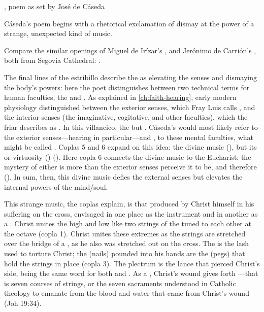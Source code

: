 {, poem as set by José de Cáseda}


Cáseda's poem begins with a rhetorical exclamation of dismay at the power of a
strange, unexpected kind of music.%
\begin{Footnote}
    Compare the similar openings of Miguel de Irízar's , and Jerónimo de Carrión's ,
    both from Segovia Cathedral: \autocite[\XXX]{Cashner:PhD}.
\end{Footnote}
The final lines of the estribillo describe the  as
elevating the senses and dismaying the body's powers: here the poet
distinguishes between two technical terms for human faculties, the
 and .
As explained in \cref{ch:faith-hearing}, early modern physiology distinguished
between the exterior senses, which Fray Luis calls , and the interior senses (the imaginative, cogitative, and other
faculties), which the friar describes as .
In this villancico, the   but
.  
Cáseda's  would most likely refer to the exterior
senses---hearing in particular---and , to these mental
faculties, what might be called .
Coplas 5 and 6 expand on this idea: the divine music  (), but its  or virtuosity
() 
().
Here copla 6 connects the divine music to the Eucharist: the mystery of either
is more than the exterior senses perceive it to be, and therefore
().
In sum, then, this divine music defies the external senses but elevates the
internal powers of the mind/soul.


This strange music, the coplas explain, is that produced by Christ himself in
his suffering on the cross, envisaged in one place as the instrument
 and in another as a .
Christ unites the high and low like two strings of the  tuned to
each other at the octave (copla 1).  
Christ unites these extremes as the strings are stretched over the bridge of a
, as he also was stretched out on the cross.
The  is the lash used to torture Christ; the 
(nails) pounded into his hands are the  (pegs) that hold the
strings in place (copla 3).
The plectrum is the lance that pierced Christ's side,  being the
same word for both  and .
As a , Christ's wound gives forth ---that is
seven courses of strings, or the seven sacraments understood in Catholic
theology to emanate from the blood and water that came from Christ's wound (Joh
19:34).

